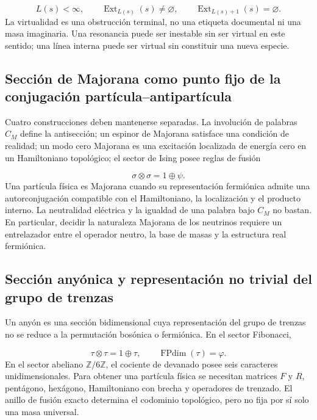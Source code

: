 \[
L(s)<\infty,
\qquad
\operatorname{Ext}_{L(s)}(s)\ne\varnothing,
\qquad
\operatorname{Ext}_{L(s)+1}(s)=\varnothing.
\]
La virtualidad es una obstrucción terminal, no una etiqueta documental ni una masa imaginaria. Una resonancia puede ser inestable sin ser virtual en este sentido; una línea interna puede ser virtual sin constituir una nueva especie.

\subsection{Sección de Majorana como punto fijo de la conjugación partícula–antipartícula}
Cuatro construcciones deben mantenerse separadas. La involución de palabras \(C_M\) define la antisección; un espinor de Majorana satisface una condición de realidad; un modo cero Majorana es una excitación localizada de energía cero en un Hamiltoniano topológico; el sector de Ising posee reglas de fusión

\[
\sigma\otimes\sigma=1\oplus\psi.
\]
Una partícula física es Majorana cuando su representación fermiónica admite una autorconjugación compatible con el Hamiltoniano, la localización y el producto interno. La neutralidad eléctrica y la igualdad de una palabra bajo \(C_M\) no bastan. En particular, decidir la naturaleza Majorana de los neutrinos requiere un entrelazador entre el operador neutro, la base de masas y la estructura real fermiónica.

\subsection{Sección anyónica y representación no trivial del grupo de trenzas}
Un anyón es una sección bidimensional cuya representación del grupo de trenzas no se reduce a la permutación bosónica o fermiónica. En el sector Fibonacci,

\[
\tau\otimes\tau=1\oplus\tau,
\qquad
\operatorname{FPdim}(\tau)=\varphi.
\]
En el sector abeliano \(\mathbb Z/6\mathbb Z\), el cociente de devanado posee seis caracteres unidimensionales. Para obtener una partícula física se necesitan matrices \(F\) y \(R\), pentágono, hexágono, Hamiltoniano con brecha y operadores de trenzado. El anillo de fusión exacto determina el codominio topológico, pero no fija por sí solo una masa universal.

